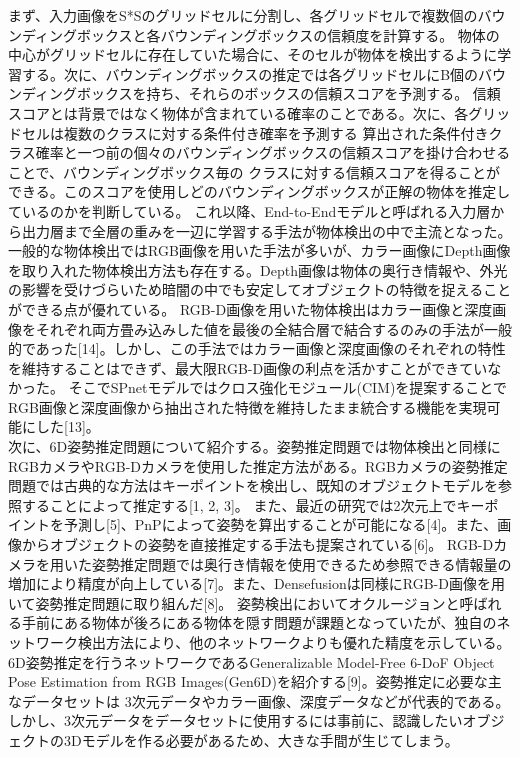 まず、入力画像をS*Sのグリッドセルに分割し、各グリッドセルで複数個のバウンディングボックスと各バウンディングボックスの信頼度を計算する。
物体の中心がグリッドセルに存在していた場合に、そのセルが物体を検出するように学習する。次に、バウンディングボックスの推定では各グリッドセルにB個のバウンディングボックスを持ち、それらのボックスの信頼スコアを予測する。
信頼スコアとは背景ではなく物体が含まれている確率のことである。次に、各グリッドセルは複数のクラスに対する条件付き確率を予測する
算出された条件付きクラス確率と一つ前の個々のバウンディングボックスの信頼スコアを掛け合わせることで、バウンディングボックス毎の
クラスに対する信頼スコアを得ることができる。このスコアを使用しどのバウンディングボックスが正解の物体を推定しているのかを判断している。
これ以降、End-to-Endモデルと呼ばれる入力層から出力層まで全層の重みを一辺に学習する手法が物体検出の中で主流となった。\\
一般的な物体検出ではRGB画像を用いた手法が多いが、カラー画像にDepth画像を取り入れた物体検出方法も存在する。Depth画像は物体の奥行き情報や、外光の影響を受けづらいため暗闇の中でも安定してオブジェクトの特徴を捉えることができる点が優れている。
RGB-D画像を用いた物体検出はカラー画像と深度画像をそれぞれ両方畳み込みした値を最後の全結合層で結合するのみの手法が一般的であった[14]。しかし、この手法ではカラー画像と深度画像のそれぞれの特性を維持することはできず、最大限RGB-D画像の利点を活かすことができていなかった。
そこでSPnetモデルではクロス強化モジュール(CIM)を提案することでRGB画像と深度画像から抽出された特徴を維持したまま統合する機能を実現可能にした[13]。\\
次に、6D姿勢推定問題について紹介する。姿勢推定問題では物体検出と同様にRGBカメラやRGB-Dカメラを使用した推定方法がある。RGBカメラの姿勢推定問題では古典的な方法はキーポイントを検出し、既知のオブジェクトモデルを参照することによって推定する[1, 2, 3]。
また、最近の研究では2次元上でキーポイントを予測し[5]、PnPによって姿勢を算出することが可能になる[4]。また、画像からオブジェクトの姿勢を直接推定する手法も提案されている[6]。
RGB-Dカメラを用いた姿勢推定問題では奥行き情報を使用できるため参照できる情報量の増加により精度が向上している[7]。また、Densefusionは同様にRGB-D画像を用いて姿勢推定問題に取り組んだ[8]。
姿勢検出においてオクルージョンと呼ばれる手前にある物体が後ろにある物体を隠す問題が課題となっていたが、独自のネットワーク検出方法により、他のネットワークよりも優れた精度を示している。
6D姿勢推定を行うネットワークであるGeneralizable Model-Free 6-DoF Object Pose Estimation from RGB Images(Gen6D)を紹介する[9]。姿勢推定に必要な主なデータセットは
3次元データやカラー画像、深度データなどが代表的である。しかし、3次元データをデータセットに使用するには事前に、認識したいオブジェクトの3Dモデルを作る必要があるため、大きな手間が生じてしまう。
